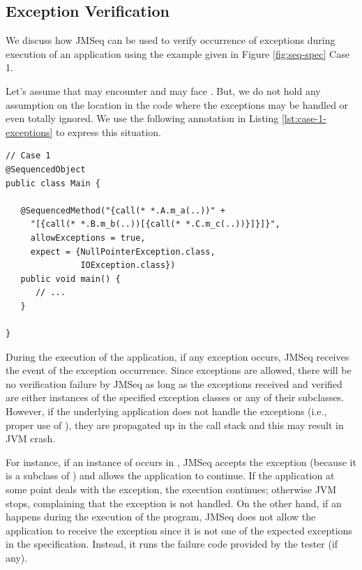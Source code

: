 \subsection{Exception Verification}
We discuss how JMSeq can be used to verify  occurrence of exceptions during
execution of an application using the example given in Figure
\ref{fig:seq-spec} Case 1.

Let's assume that  may encounter
 and  may face
. But, we do not hold any assumption on the
location in the code where the exceptions may be handled or even
totally ignored. We use the following annotation in Listing
\ref{lst:case-1-exceptions} to express this situation.

\lstset{language=Java}
\begin{lstlisting}[label=lst:case-1-exceptions, caption=Exception
Specification for Case 1]
// Case 1
@SequencedObject
public class Main {

   @SequencedMethod("{call(* *.A.m_a(..))" + 
     "[{call(* *.B.m_b(..))[{call(* *.C.m_c(..))}]}]}",
     allowExceptions = true,
     expect = {NullPointerException.class, 
               IOException.class}) 
   public void main() { 
      // ...
   }

}
\end{lstlisting}

During the execution of the application, if any exception occurs,
JMSeq receives the event of the exception occurrence. Since exceptions
are allowed, there will be no verification failure by JMSeq as long as
the exceptions received and verified are either instances of the
specified exception classes or any of their subclasses.
However, if the underlying application does not handle the exceptions
(i.e., proper use of ), they are
propagated up in the call stack and this may result in JVM crash.

For instance, if an instance of  occurs
in , JMSeq accepts the exception (because it is a subclass of
) and allows the application to continue. If the
application at some point deals with the exception, the execution
continues; otherwise JVM stops, complaining that the exception is not handled.
On the other hand, if an 
happens during the execution of the program, JMSeq does not allow the
application to receive the exception since it is not one of the expected
exceptions in the specification. 
Instead, it runs the failure code provided by the tester (if any).

